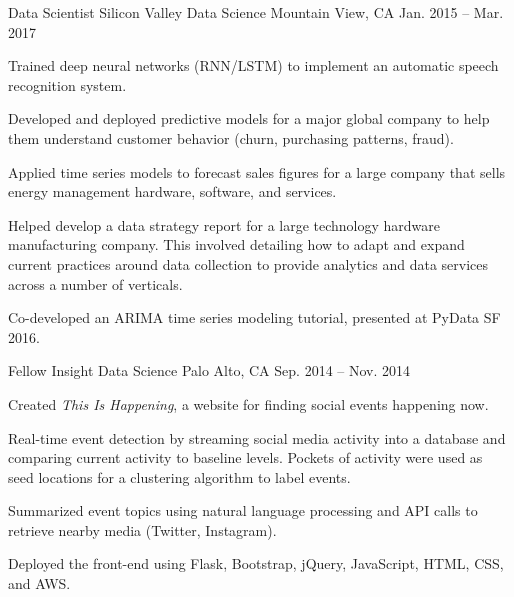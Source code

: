 \begin{cventries}
  \cventry
    {Data Scientist} %
    {Silicon Valley Data Science} %
    {Mountain View, CA} %
    {Jan. 2015 -- Mar. 2017} %
    {
      \begin{cvitems} %
        \item {Trained deep neural networks (RNN/LSTM) to implement an automatic speech recognition system.}
        \item {Developed and deployed predictive models for a major global company to help them understand customer behavior (churn, purchasing patterns, fraud).}
        \item {Applied time series models to forecast sales figures for a large company that sells energy management hardware, software, and services.}
        \item {Helped develop a data strategy report for a large technology hardware manufacturing company. This involved detailing how to adapt and expand current practices around data collection to provide analytics and data services across a number of verticals.}
        \item {Co-developed an ARIMA time series modeling tutorial, presented at PyData SF 2016.}
      \end{cvitems}
    }

  \cventry
    {Fellow} %
    {Insight Data Science} %
    {Palo Alto, CA} %
    {Sep. 2014 -- Nov. 2014} %
    {
      \begin{cvitems} %
        \item {Created \textit{This Is Happening}, a website for finding social events happening now.}
        \item {Real-time event detection by streaming social media activity into a database and comparing current activity to baseline levels.  Pockets of activity were used as seed locations for a clustering algorithm to label events.}
        \item {Summarized event topics using natural language processing and API calls to retrieve nearby media (Twitter, Instagram).}
        \item {Deployed the front-end using Flask, Bootstrap, jQuery, JavaScript, HTML, CSS, and AWS.}
      \end{cvitems}
    }


\end{cventries}
